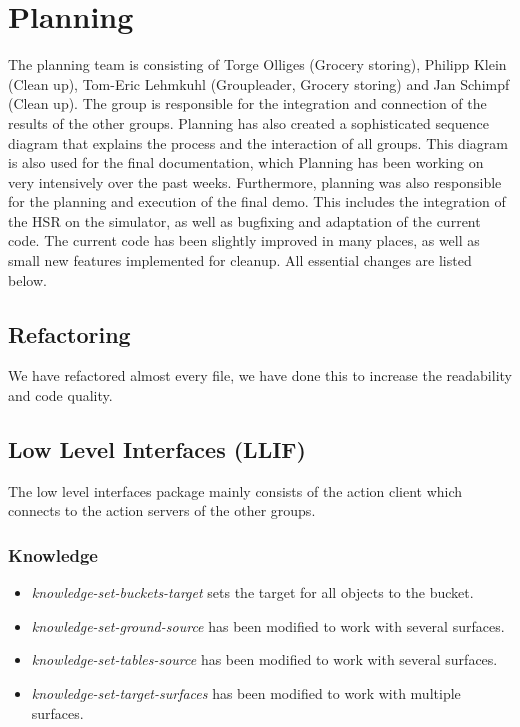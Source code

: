 \documentclass[main.tex]{subfiles}
\begin{document}
	
	\chapter{Planning}
                The planning team is consisting of Torge Olliges (Grocery storing), Philipp Klein (Clean up), Tom-Eric Lehmkuhl (Groupleader, Grocery storing) and Jan Schimpf (Clean up). The group is responsible for the integration and connection of the results of the other groups. Planning has also created a sophisticated sequence diagram that explains the process and the interaction of all groups. This diagram is also used for the final documentation, which Planning has been working on very intensively over the past weeks. Furthermore, planning was also responsible for the planning and execution of the final demo. This includes the integration of the HSR on the simulator, as well as bugfixing and adaptation of the current code. The current code has been slightly improved in many places, as well as small new features implemented for cleanup. All essential changes are listed below. 
          
          		\section{Refactoring}
	        	    We have refactored almost every file, we have done this to increase the readability and code quality.   
	        	    
	        	\section{Low Level Interfaces (LLIF)}
	                The low level interfaces package mainly consists of the action client which connects to the action servers of the other groups.
                
               
                \subsection{Knowledge}
	                
				    \begin{itemize}
				      \item \textit{knowledge-set-buckets-target} sets the target for all objects to the bucket.
				       \item \textit{knowledge-set-ground-source} has been modified to work with several surfaces. 
				       \item \textit{knowledge-set-tables-source} has been modified to work with several surfaces. 
				       \item \textit{knowledge-set-target-surfaces} has been modified to work with multiple surfaces.
		
				    \end{itemize} 
                                           
\end{document}
